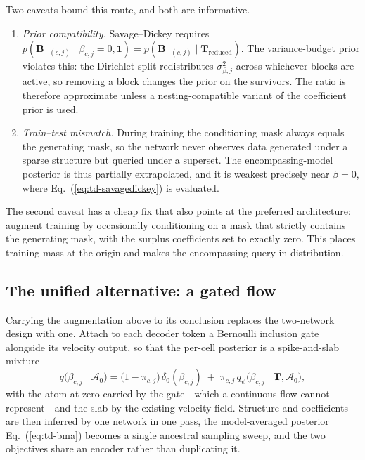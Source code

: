 \documentclass[11pt]{article}
\newcommand{\rmB}{\mathbf{B}}
\newcommand{\rmT}{\mathbf{T}}
\providecommand{\cref}[1]{Eq.~(\ref{#1})}
\begin{document}
Two caveats bound this route, and both are informative.

\begin{enumerate}
\item \emph{Prior compatibility.} Savage--Dickey requires
$p(\rmB_{-(c,j)} \mid \beta_{c,j} = 0, \bm{1}) = p(\rmB_{-(c,j)} \mid \rmT_{\mathrm{reduced}})$.
The variance-budget prior violates this: the Dirichlet split redistributes
$\sigma^2_{\beta,j}$ across whichever blocks are active, so removing a block changes the
prior on the survivors. The ratio is therefore approximate unless a nesting-compatible
variant of the coefficient prior is used.
\item \emph{Train--test mismatch.} During training the conditioning mask always equals
the generating mask, so the network never observes data generated under a sparse
structure but queried under a superset. The encompassing-model posterior is thus
partially extrapolated, and it is weakest precisely near $\beta = 0$, where
\cref{eq:td-savagedickey} is evaluated.
\end{enumerate}

The second caveat has a cheap fix that also points at the preferred architecture:
augment training by occasionally conditioning on a mask that strictly contains the
generating mask, with the surplus coefficients set to exactly zero. This places training
mass at the origin and makes the encompassing query in-distribution.

\subsection{The unified alternative: a gated flow}

Carrying the augmentation above to its conclusion replaces the two-network design with
one. Attach to each decoder token a Bernoulli inclusion gate alongside its velocity
output, so that the per-cell posterior is a spike-and-slab mixture
%
\begin{equation}
\label{eq:td-gatedflow}
q\big(\beta_{c,j} \mid \mathcal{A}_0\big)
= \big(1 - \pi_{c,j}\big)\,\delta_0(\beta_{c,j})
\;+\; \pi_{c,j}\, q_\psi\big(\beta_{c,j} \mid \rmT, \mathcal{A}_0\big),
\end{equation}
%
with the atom at zero carried by the gate---which a continuous flow cannot
represent---and the slab by the existing velocity field. Structure and coefficients are
then inferred by one network in one pass, the model-averaged posterior
\cref{eq:td-bma} becomes a single ancestral sampling sweep, and the two objectives share
an encoder rather than duplicating it.
\end{document}
